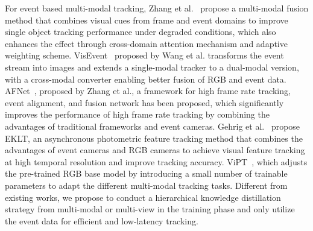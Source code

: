 For event based multi-modal tracking, Zhang et al.~\cite{zhang2021fe108} propose a multi-modal fusion method that combines visual cues from frame and event domains to improve single object tracking performance under degraded conditions, which also enhances the effect through cross-domain attention mechanism and adaptive weighting scheme. 
VisEvent~\cite{wang2024visevent} proposed by Wang et al. transforms the event stream into images and extends a single-modal tracker to a dual-modal version, with a cross-modal converter enabling better fusion of RGB and event data. 
AFNet~\cite{zhang2023AFNet}, proposed by Zhang et al., a framework for high frame rate tracking, event alignment, and fusion network has been proposed, which significantly improves the performance of high frame rate tracking by combining the advantages of traditional frameworks and event cameras.  
Gehrig et al.~\cite{gehrig2020eklt} propose EKLT, an asynchronous photometric feature tracking method that combines the advantages of event cameras and RGB cameras to achieve visual feature tracking at high temporal resolution and improve tracking accuracy. 
ViPT~\cite{zhu2023promptTrack}, which adjusts the pre-trained RGB base model by introducing a small number of trainable parameters to adapt the different multi-modal tracking tasks. 
Different from existing works, we propose to conduct a hierarchical knowledge distillation strategy from multi-modal or multi-view in the training phase and only utilize the event data for efficient and low-latency tracking. 




